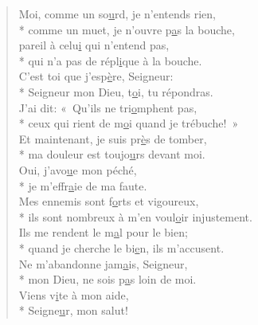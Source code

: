 \begin{verse}
Moi, comme un so\underline{u}rd, je n’entends rien, \\*
comme un muet, je n’ouvre p\underline{a}s la bouche, \\
pareil à celu\underline{i} qui n’entend pas, \\*
qui n’a pas de répl\underline{i}que à la bouche. \\

C’est toi que j’esp\underline{è}re, Seigneur: \\*
Seigneur mon Dieu, t\underline{o}i, tu répondras. \\
J’ai dit: « Qu’ils ne tri\underline{o}mphent pas, \\*
ceux qui rient de m\underline{o}i quand je trébuche! » \\

Et maintenant, je suis pr\underline{è}s de tomber, \\*
ma douleur est toujo\underline{u}rs devant moi. \\
Oui, j’avo\underline{u}e mon péché, \\*
je m’effr\underline{a}ie de ma faute. \\

Mes ennemis sont f\underline{o}rts et vigoureux, \\*
ils sont nombreux à m’en voul\underline{o}ir injustement. \\
Ils me rendent le m\underline{a}l pour le bien; \\*
quand je cherche le bi\underline{e}n, ils m’accusent. \\

Ne m’abandonne jam\underline{a}is, Seigneur, \\*
mon Dieu, ne sois p\underline{a}s loin de moi. \\
Viens v\underline{i}te à mon aide, \\*
Seigne\underline{u}r, mon salut! \\
\end{verse}

